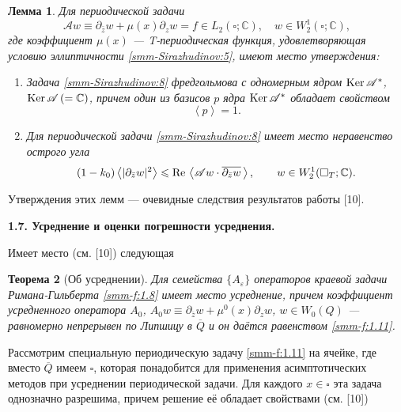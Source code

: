 \documentclass[a4paper,12pt]{article}
\newtheorem{theorem}{Теорема}[section]
\newtheorem{lemma}[theorem]{Лемма}
\theoremstyle{definition}
\begin{document}
	\begin{lemma}
		Для периодической задачи
		\begin{equation}\label{smm-Sirazhudinov:8}
			\mathscr{A}w\equiv \partial_{\bar{z}}w +\mu(x) \partial_{z}w =f\in L_2(\square;\mathbb{C}),\quad
			w\in W_2^1(\square;\mathbb{C}),
		\end{equation}
		где коэффициент $\mu(x)$  --- {\rm T}-периодическая функция, удовлетворяющая условию эллиптичности \eqref{smm-Sirazhudinov:5}, имеют место  утверждения:
		\begin{enumerate}
			\item[1)] Задача  \eqref{smm-Sirazhudinov:8} фредгольмова с одномерным ядром $\text{\rm Ker\,}\mathscr{A}^\ast$, $\text{\rm Ker\,}\mathscr{A}\,(=\mathbb{C})$,
			причем один из базисов $p$ ядра
			$\text{\rm Ker\,}\mathscr{A}^\ast$ обладает свойством
			\begin{equation*}%
				\left< p\right>=1.
			\end{equation*}
			\item[2)] Для периодической задачи \eqref{smm-Sirazhudinov:8} имеет место неравенство острого угла
			\begin{equation}\label{smm-Sirazhudinov:9}
				(1-k_0)\left<|\partial_{\bar{z}}w|^2\right>\leqslant \text{\rm Re\,}
				\left<\mathscr{A} w\cdot \overline{\partial_{\bar{z}}w}\,\right>,\qquad
				w \in W_2^1(\square_T;\mathbb{C}).
			\end{equation}
		\end{enumerate}
	\end{lemma}
	Утверждения этих лемм --- очевидные следствия результатов работы [10].


	\smallskip
	\textbf{1.7. Усреднение и оценки погрешности усреднения.}
	
	Имеет место (см. [10])  следующая
	
\begin{theorem}[Об усреднении]
 Для семейства $\{A_\varepsilon\}$ операторов краевой
		задачи Римана-Гильберта \eqref{smm-f:1.8} имеет место усреднение, причем коэффициент
		усредненного оператора $A_0$, $A_0w\equiv\partial_{\overline{z}}w+\mu^0(x)\partial_zw$, $w\in W_0(Q)$ --- равномерно непрерывен  по Липшицу в $\overline{Q}$ и он даётся равенством \eqref{smm-f:1.11}.
\end{theorem}

Рассмотрим специальную периодическую задачу \eqref{smm-f:1.11} на ячейке, где вместо $\overline{Q}$ имеем $\square$,  которая понадобится для применения асимптотических методов при усреднении периодической задачи. Для каждого $x\in\square$ эта задача однозначно разрешима, причем решение её обладает свойствами (см. [10])
\end{document}
